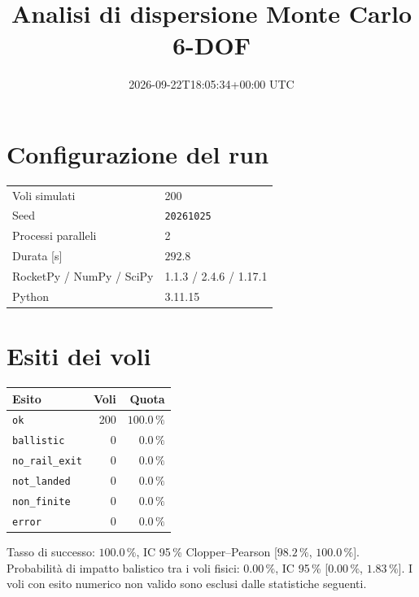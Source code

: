 \documentclass[11pt,a4paper]{article}
\title{Analisi di dispersione Monte Carlo 6-DOF}
\date{2026-09-22T18:05:34+00:00 UTC}
\author{}
\begin{document}
\maketitle
\section{Configurazione del run}
\begin{table}[H]\centering\begin{tabular}{ll}\toprule
Voli simulati & 200 \\
Seed & \texttt{20261025} \\
Processi paralleli & 2 \\
Durata [s] & $292.8$ \\
RocketPy / NumPy / SciPy & 1.1.3 / 2.4.6 / 1.17.1 \\
Python & 3.11.15 \\
\bottomrule\end{tabular}\end{table}
\section{Esiti dei voli}
\begin{table}[H]\centering\begin{tabular}{lrr}\toprule
Esito & Voli & Quota \\ \midrule
\texttt{ok} & 200 & $100.0\,\%$ \\
\texttt{ballistic} & 0 & $0.0\,\%$ \\
\texttt{no\_rail\_exit} & 0 & $0.0\,\%$ \\
\texttt{not\_landed} & 0 & $0.0\,\%$ \\
\texttt{non\_finite} & 0 & $0.0\,\%$ \\
\texttt{error} & 0 & $0.0\,\%$ \\
\bottomrule\end{tabular}\end{table}
Tasso di successo: $100.0\,\%$, IC 95\,\% Clopper--Pearson [$98.2\,\%$, $100.0\,\%$]. Probabilità di impatto balistico tra i voli fisici: $0.00\,\%$, IC 95\,\% [$0.00\,\%$, $1.83\,\%$]. I voli con esito numerico non valido sono esclusi dalle statistiche seguenti.
\end{document}
